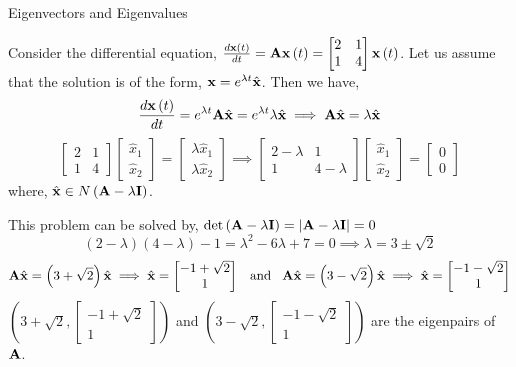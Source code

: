 \documentclass[aspectratio=169]{beamer}
\def\mf{\ensuremath\mathbf}
\begin{document}
\begin{frame}[t]{Eigenvectors and Eigenvalues}
\begin{small}
Consider the differential equation, $\frac{d\mf{x}\left(t\right)}{dt} = \mf{A}\mf{x}\left(t\right) = \begin{bmatrix*}2 & 1\\1 & 4\end{bmatrix*}\mf{x}\left(t\right)$. Let us assume that the solution is of the form, $\mf{x} = e^{\lambda t}\hat{\mf{x}}$. Then we have,
\[ \frac{d\mf{x}\left(t\right)}{dt} = e^{\lambda t}\mf{A}\hat{\mf{x}} = e^{\lambda t} \lambda \hat{\mf{x}} \implies \mf{A}\hat{\mf{x}} = \lambda \hat{\mf{x}} \]
\[ \begin{bmatrix*}2 & 1\\1 & 4\end{bmatrix*}\begin{bmatrix*}\hat{x}_1\\\hat{x}_2\end{bmatrix*} = \begin{bmatrix*}\lambda \hat{x}_1\\\lambda \hat{x}_2\end{bmatrix*} \implies \begin{bmatrix*}2 - \lambda & 1\\1 & 4 - \lambda\end{bmatrix*}\begin{bmatrix*}\hat{x}_1\\\hat{x}_2\end{bmatrix*} = \begin{bmatrix*}0\\0\end{bmatrix*} \]
where, $\hat{\mf{x}} \in N\left(\mf{A} - \lambda\mf{I}\right)$.
\vspace{0.2cm}

This problem can be solved by, $\det \left(\mf{A} - \lambda\mf{I}\right) = \left\lvert\mf{A} - \lambda\mf{I}\right\rvert = 0$
\[ \left(2 - \lambda\right)\left(4 - \lambda\right) - 1  = \lambda^2 - 6\lambda + 7 = 0 \implies \lambda = 3 \pm \sqrt{2} \]
\[ \mf{A}\hat{\mf{x}} = \left(3 + \sqrt{2}\right) \hat{\mf{x}} \implies \hat{\mf{x}} =  \begin{bmatrix*}-1 + \sqrt{2}\\1\end{bmatrix*} \,\,\, \text{ and } \,\,\, \mf{A}\hat{\mf{x}} = \left(3 - \sqrt{2}\right) \hat{\mf{x}} \implies \hat{\mf{x}} =  \begin{bmatrix*}-1 - \sqrt{2}\\1\end{bmatrix*} \]
$\left(3 + \sqrt{2}, \begin{bmatrix*}-1 + \sqrt{2}\\1\end{bmatrix*}\right)$ and $\left(3 - \sqrt{2}, \begin{bmatrix*}-1 - \sqrt{2}\\1\end{bmatrix*}\right)$ are the eigenpairs of $\mf{A}$.
\end{small}
\end{frame}
\end{document}
